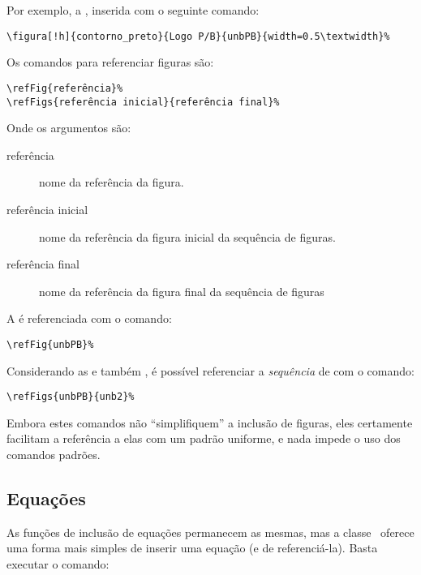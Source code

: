 Por exemplo, a , inserida com o seguinte comando:

\begin{verbatim}
\figura[!h]{contorno_preto}{Logo P/B}{unbPB}{width=0.5\textwidth}%
\end{verbatim}

%

Os comandos para referenciar figuras são:

\begin{verbatim}
\refFig{referência}%
\refFigs{referência inicial}{referência final}%
\end{verbatim}

Onde os argumentos são:
\begin{description}
\item[referência] nome da referência da figura.
\item[referência inicial] nome da referência da figura inicial da sequência de figuras.
\item[referência final] nome da referência da figura final da sequência de figuras
\end{description}

A  é referenciada com o comando:
\begin{verbatim}
\refFig{unbPB}%
\end{verbatim}

%

Considerando as  e também , é possível referenciar 
a \emph{sequência} de  com o comando:
\begin{verbatim}
\refFigs{unbPB}{unb2}%
\end{verbatim}

Embora estes comandos não ``simplifiquem'' a inclusão de figuras, eles 
certamente facilitam a referência a elas com um padrão uniforme, e nada impede o 
uso dos comandos padrões.

%



\subsection{Equações}
As funções de inclusão de equações permanecem as mesmas, mas a classe \unbcic\ 
oferece uma forma mais simples de inserir uma equação (e de referenciá-la). Basta 
executar o comando:

